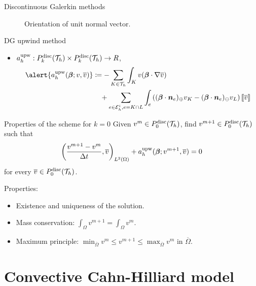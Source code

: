 \begin{frame}{Discontinuous Galerkin methods}
\begin{minipage}{0.29\textwidth}
\begin{figure}
			{\scriptsize{} Orientation of unit normal vector.}
		\end{figure}
	\end{minipage}
\end{frame}

\begin{frame}{DG upwind method}
	\vspace*{-0.1cm}
	\begin{itemize}\itemsep1em
		\item $a_h^{\text{upw}}:\relax{P}^{\text{disc}}_k(\mathcal{T}_h)\times \relax{P}^{\text{disc}}_k(\mathcal{T}_h)\to\relax R$,
		\begin{equation*}
			\begin{aligned}
				\alert{\aupw{\bbeta}{v}{\bv}}&\coloneqq-\sum_{K\in\T_h}\int_K v (\bbeta\cdot\nabla \bv)
				\\&\quad+\sum_{e\in\E_h^i, e=K\cap L}\int_e\left( (\bbeta\cdot\nn_e)_{\oplus}\vK
				-(\bbeta\cdot\nn_e)_{\ominus} \vL\right) \salto{\bv}
			\end{aligned}
		\end{equation*}
	\end{itemize}
	
\end{frame}

\begin{frame}{Properties of the scheme for $k=0$}
	Given $v^m\in\relax{P}^{\text{disc}}_0(\mathcal{T}_h)$, find $v^{m+1}\in \relax{P}^{\text{disc}}_0(\mathcal{T}_h)$ such that $$\left(\frac{v^{m+1}-v^{m}}{\Delta t},\overline{v}\right)_{L^2(\Omega)}+a_h^{\text{upw}}(\boldsymbol{\beta};v^{m+1},\overline{v})=0$$ for every $\overline{v}\in\relax{P}^{\text{disc}}_0(\mathcal{T}_h)$.
	
	\vspace*{1cm}
	Properties:
	\begin{itemize}
		\item \alert{Existence} and \alert{uniqueness} of the solution.
		\item \alert{Mass conservation}: $\int_\Omega v^{m+1}=\int_\Omega v^m$.
		\item \alert{Maximum principle}: $\min_{\overline\Omega}{v^m}\le v^{m+1}\le\max_{\overline\Omega}{v^m}$ in $ \overline\Omega$.
	\end{itemize}
\end{frame}

\section{Convective Cahn-Hilliard model}

